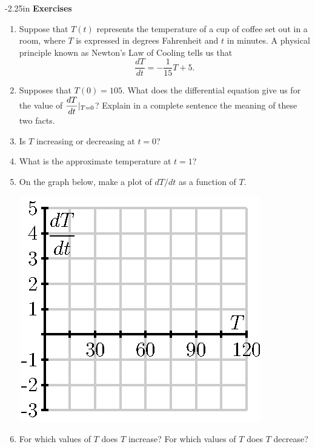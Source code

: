 \begin{adjustwidth*}{}{-2.25in}
\textbf{{\large Exercises}}
\setlength{\columnsep}{25pt}
\begin{multicols*}{2}

 \small

\begin{enumerate}[1)]
 \item Suppose that $T(t)$ represents the temperature of a cup of
    coffee set out in a room, where $T$ is expressed in degrees
    Fahrenheit and $t$ in minutes.  A physical principle known as    Newton's Law of Cooling tells us that 
    $$
    \frac{dT}{dt}= -\frac1{15}T+5.
    $$

\ba
    \item Supposes that $T(0)=105$.  What does the differential
    equation give us for the value of $\displaystyle \frac{dT}{dt}\vert_{T=0}$?  Explain in a
    complete sentence the meaning of these two facts.

    \item Is $T$ increasing or decreasing at $t=0$?

    \item What is the approximate temperature at $t=1$?

    \item On the graph below, make a plot of $dT/dt$ as a function of $T$.
        \begin{center}
          \includegraphics{figures/7_1_exercise_1.eps}
        \end{center}

       \item For which values of $T$ does $T$ increase?  For
        which values of $T$ does $T$ decrease?


\end{enumerate}
\end{multicols*}
\end{adjustwidth*}
